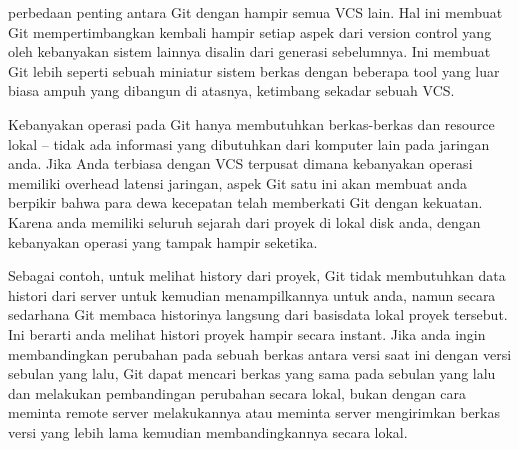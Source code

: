 {\vspace{\baselineskip}
\vspace{14pt}
\noindent 
{\fontsize{14pt}{14pt}\selectfont perbedaan penting antara Git dengan hampir semua VCS lain. Hal ini membuat Git mempertimbangkan kembali hampir setiap aspek dari version control yang oleh kebanyakan sistem lainnya disalin dari generasi sebelumnya. Ini membuat Git lebih seperti sebuah miniatur sistem berkas dengan beberapa tool yang luar biasa ampuh yang dibangun di atasnya, ketimbang sekadar sebuah VCS. $  $ \\} \par

 \vspace{\baselineskip}
\noindent 
{\fontsize{14pt}{14pt}\selectfont Kebanyakan operasi pada Git hanya membutuhkan berkas-berkas dan resource lokal – tidak ada informasi yang dibutuhkan dari komputer lain pada jaringan anda. Jika Anda terbiasa dengan VCS terpusat dimana kebanyakan operasi memiliki overhead latensi jaringan, aspek Git satu ini akan membuat anda berpikir bahwa para dewa kecepatan telah memberkati Git dengan kekuatan. Karena anda memiliki seluruh sejarah dari proyek di lokal disk anda, dengan kebanyakan operasi yang tampak hampir seketika. \\} \par

\vspace{\baselineskip}
\noindent 
{\fontsize{14pt}{14pt}\selectfont Sebagai contoh, untuk melihat history dari proyek, Git tidak membutuhkan data histori dari server untuk kemudian menampilkannya untuk anda, namun secara sedarhana Git membaca historinya langsung dari basisdata lokal proyek tersebut. Ini berarti anda melihat histori proyek hampir secara instant. Jika anda ingin membandingkan perubahan pada sebuah berkas antara versi saat ini dengan versi sebulan yang lalu, Git dapat mencari berkas yang sama pada sebulan yang lalu dan melakukan pembandingan perubahan secara lokal, bukan dengan cara meminta remote server melakukannya atau meminta server mengirimkan berkas versi yang lebih lama kemudian membandingkannya secara lokal. \\} \par

}
